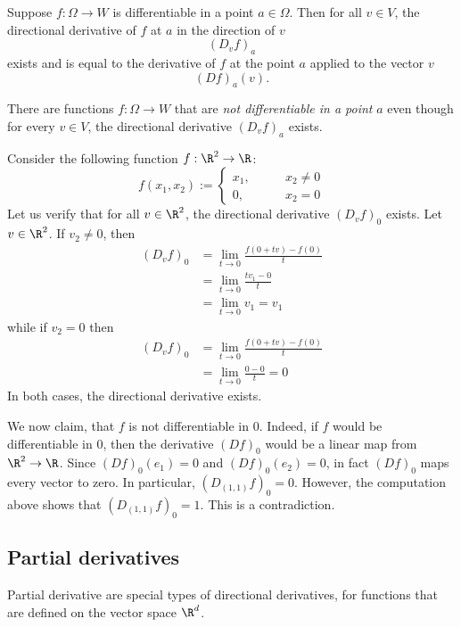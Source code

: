 \begin{proposition}
    Suppose $f: \Omega \to W$ is differentiable in a point $a \in \Omega$.
    Then for all $v \in V$, the directional derivative of $f$ at $a$ in the 
    direction of $v$
    $$(D_vf)_a$$
    exists and is equal to the derivative of $f$ at the point $a$ applied to
    the vector $v$
    $$(Df)_a(v).$$
\end{proposition}
\begin{warning}
    There are functions $f: \Omega \to W$ that are \emph{not differentiable in a point}
    $a$ even though for every $v \in V$, the directional derivative $(D_vf)_a$ exists.
\end{warning}
\begin{example}
    Consider the following function $f: \R^2 \to \R$:
    $$f(x_1,x_2) := \begin{cases} x_1, \qquad &x_2 \ne 0 \\ 0, \qquad &x_2 = 0 \end{cases}$$
    Let us verify that for all $v \in \R^2$, the directional derivative $(D_vf)_0$ exists.
    Let $v \in \R^2$. If $v_2 \ne 0$, then
    \begin{align*}
        (D_vf)_0 &= \lim_{t\to 0}\frac{f(0+tv)-f(0)}{t} \\
                 &= \lim_{t\to 0}\frac{tv_1 - 0}{t} \\
                 &= \lim_{t\to 0}v_1 = v_1
    \end{align*}
    while if $v_2 = 0$ then
    \begin{align*}
        (D_vf)_0 &= \lim_{t\to 0}\frac{f(0+tv)-f(0)}{t} \\
                 &= \lim_{t\to 0}\frac{0-0}{t} = 0
    \end{align*}
    In both cases, the directional derivative exists.

    We now claim, that $f$ is not differentiable in $0$. Indeed, if $f$ would be 
    differentiable in $0$, then the derivative $(Df)_0$ would be a linear map from
    $\R^2 \to \R$. Since $(Df)_0(e_1) = 0$ and $(Df)_0(e_2) = 0$, in fact $(Df)_0$
    maps every vector to zero. In particular, $(D_{(1,1)}f)_0 = 0$. However, the 
    computation above shows that $(D_{(1,1)}f)_0 = 1$. This is a contradiction.
\end{example}

\subsection{Partial derivatives}
Partial derivative are special types of directional derivatives, for functions that
are defined on the vector space $\R^d$.

